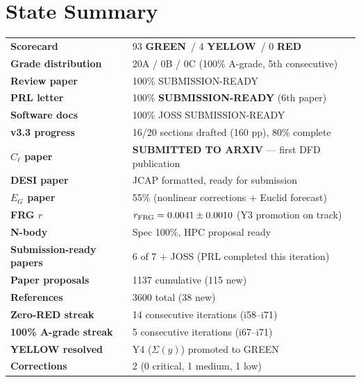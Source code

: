 \documentclass[11pt,a4paper]{article}
\newcommand{\GREEN}{\textcolor{dfdgreen}{\textbf{GREEN}}}
\newcommand{\YELLOW}{\textcolor{dfdyellow}{\textbf{YELLOW}}}
\newcommand{\RED}{\textcolor{dfdred}{\textbf{RED}}}
\begin{document}
\section{State Summary}

\begin{tcolorbox}[colback=green!5,colframe=dfdgreen,title=i71 State]
\begin{center}
\begin{tabular}{ll}
\textbf{Scorecard} & 93 \GREEN\ / 4 \YELLOW\ / 0 \RED \\
\textbf{Grade distribution} & 20A / 0B / 0C (100\% A-grade, 5th consecutive) \\
\textbf{Review paper} & 100\% SUBMISSION-READY \\
\textbf{PRL letter} & 100\% \textbf{SUBMISSION-READY} (6th paper) \\
\textbf{Software docs} & 100\% JOSS SUBMISSION-READY \\
\textbf{v3.3 progress} & 16/20 sections drafted (160 pp), 80\% complete \\
\textbf{$C_\ell$ paper} & \textbf{SUBMITTED TO ARXIV} --- first DFD publication \\
\textbf{DESI paper} & JCAP formatted, ready for submission \\
\textbf{$E_G$ paper} & 55\% (nonlinear corrections + Euclid forecast) \\
\textbf{FRG $r$} & $r_{\rm FRG} = 0.0041 \pm 0.0010$ (Y3 promotion on track) \\
\textbf{N-body} & Spec 100\%, HPC proposal ready \\
\textbf{Submission-ready papers} & 6 of 7 + JOSS (PRL completed this iteration) \\
\textbf{Paper proposals} & 1137 cumulative (115 new) \\
\textbf{References} & 3600 total (38 new) \\
\textbf{Zero-RED streak} & 14 consecutive iterations (i58--i71) \\
\textbf{100\% A-grade streak} & 5 consecutive iterations (i67--i71) \\
\textbf{YELLOW resolved} & Y4 ($\Sigma(y)$) promoted to GREEN \\
\textbf{Corrections} & 2 (0 critical, 1 medium, 1 low) \\
\end{tabular}
\end{center}
\end{tcolorbox}
\end{document}
